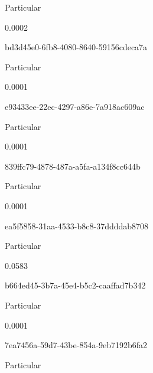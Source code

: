 \documentclass[
  11pt,
  a4paper,
  DIV=11,
  numbers=noendperiod]{scrartcl}
\begin{document}
\n      

Particular

\n      

0.0002

\n    

\n    

\n      

bd3d45e0-6fb8-4080-8640-59156cdeca7a

\n      

Particular

\n      

0.0001

\n    

\n    

\n      

e93433ee-22ec-4297-a86e-7a918ac609ac

\n      

Particular

\n      

0.0001

\n    

\n    

\n      

839ffc79-4878-487a-a5fa-a134f8cc644b

\n      

Particular

\n      

0.0001

\n    

\n    

\n      

ea5f5858-31aa-4533-b8c8-37ddddab8708

\n      

Particular

\n      

0.0583

\n    

\n    

\n      

b664ed45-3b7a-45e4-b5c2-caaffad7b342

\n      

Particular

\n      

0.0001

\n    

\n    

\n      

7ea7456a-59d7-43be-854a-9eb7192b6fa2

\n      

Particular
\end{document}
